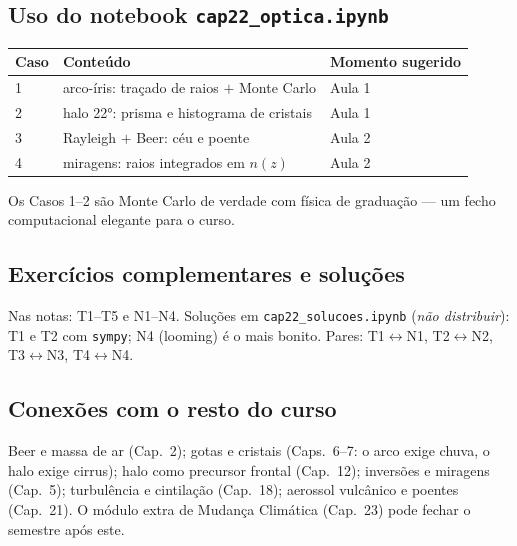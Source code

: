 \subsection*{Uso do notebook \texttt{cap22\_optica.ipynb}}

\begin{center}
\begin{tabular}{lll}
\hline
Caso & Conteúdo & Momento sugerido \\
\hline
1 & arco-íris: traçado de raios $+$ Monte Carlo & Aula 1 \\
2 & halo 22°: prisma e histograma de cristais & Aula 1 \\
3 & Rayleigh $+$ Beer: céu e poente & Aula 2 \\
4 & miragens: raios integrados em $n(z)$ & Aula 2 \\
\hline
\end{tabular}
\end{center}

Os Casos 1--2 são Monte Carlo de verdade com física de graduação — um
fecho computacional elegante para o curso.

\subsection*{Exercícios complementares e soluções}

Nas notas: T1--T5 e N1--N4. Soluções em \texttt{cap22\_solucoes.ipynb}
(\emph{não distribuir}): T1 e T2 com \texttt{sympy}; N4 (looming) é o
mais bonito. Pares: T1$\leftrightarrow$N1, T2$\leftrightarrow$N2,
T3$\leftrightarrow$N3, T4$\leftrightarrow$N4.

\subsection*{Conexões com o resto do curso}

Beer e massa de ar (Cap.~2); gotas e cristais (Caps.~6--7: o arco
exige chuva, o halo exige cirrus); halo como precursor frontal
(Cap.~12); inversões e miragens (Cap.~5); turbulência e cintilação
(Cap.~18); aerossol vulcânico e poentes (Cap.~21). O módulo extra de
Mudança Climática (Cap.~23) pode fechar o semestre após este.
